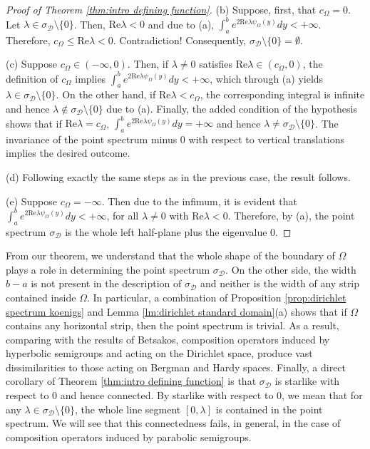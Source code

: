 \documentclass[11pt]{amsart}
\numberwithin{equation}{section}
\theoremstyle{definition}
\begin{document}
\begin{proof}[Proof of Theorem \ref{thm:intro defining function}]
		(b) Suppose, first, that $c_\Omega=0$. Let $\lambda\in\sigma_{\mathcal{D}}\setminus\{0\}$. Then, $\mathrm{Re}\lambda<0$ and due to (a), $\int_{a}^{b}e^{2\mathrm{Re}\lambda \psi_\Omega(y)}dy<+\infty$. Therefore, $c_\Omega\le\mathrm{Re}\lambda<0$. Contradiction! Consequently, $\sigma_\mathcal{D}\setminus\{0\}=\emptyset$.
		
		(c) Suppose $c_\Omega\in(-\infty,0)$. Then, if $\lambda\ne0$ satisfies $\mathrm{Re}\lambda\in(c_\Omega,0)$, the definition of $c_\Omega$ implies $\int_{a}^{b}e^{2\mathrm{Re}\lambda\psi_\Omega(y)}dy<+\infty$, which through (a) yields $\lambda\in\sigma_\mathcal{D}\setminus\{0\}$. On the other hand, if $\mathrm{Re}\lambda<c_\Omega$, the corresponding integral is infinite and hence $\lambda\notin\sigma_\mathcal{D}\setminus\{0\}$ due to (a). Finally, the added condition of the hypothesis shows that if $\mathrm{Re}\lambda=c_\Omega$, $\int_{a}^{b}e^{2\mathrm{Re}\lambda\psi_\Omega(y)}dy=+\infty$ and hence $\lambda\ne\sigma_\mathcal{D}\setminus\{0\}$. The invariance of the point spectrum minus $0$ with respect to vertical translations implies the desired outcome.
		
		(d) Following exactly the same steps as in the previous case, the result follows.
		
		(e) Suppose $c_\Omega=-\infty$. Then due to the infimum, it is evident that $\int_{a}^{b}e^{2\mathrm{Re}\lambda\psi_\Omega(y)}dy<+\infty$, for all $\lambda\ne0$ with $\mathrm{Re}\lambda<0$. Therefore, by (a), the point spectrum $\sigma_\mathcal{D}$ is the whole left half-plane plus the eigenvalue $0$.
	\end{proof}
	
	From our theorem, we understand that the whole shape of the boundary of $\Omega$ plays a role in determining the point spectrum $\sigma_\mathcal{D}$. On the other side, the width $b-a$ is not present in the description of $\sigma_\mathcal{D}$ and neither is the width of any strip contained inside $\Omega$. In particular, a combination of Proposition \ref{prop:dirichlet spectrum koenigs} and Lemma \ref{lm:dirichlet standard domain}(a) shows that if $\Omega$ contains any horizontal strip, then the point spectrum is trivial. As a result, comparing with the results of Betsakos, composition operators induced by hyperbolic semigroups and acting on the Dirichlet space, produce vast dissimilarities to those acting on Bergman and Hardy spaces. Finally, a direct corollary of Theorem \ref{thm:intro defining function} is that $\sigma_\mathcal{D}$ is starlike with respect to $0$ and hence connected. By starlike with respect to $0$, we mean that for any $\lambda\in\sigma_\mathcal{D}\setminus\{0\}$, the whole line segment $[0,\lambda]$ is contained in the point spectrum. We will see that this connectedness fails, in general, in the case of composition operators induced by parabolic semigroups.
	
\end{document}
